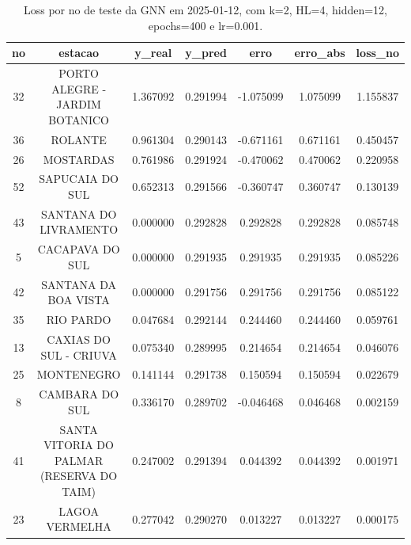 \begin{table}[h]
\centering
\caption{Loss por no de teste da GNN em 2025-01-12, com k=2, HL=4, hidden=12, epochs=400 e lr=0.001.}
\label{tab:gnn_loss_k2_hl4_h12_e400_d20250112}
\begin{tabular}{ccccccc}
\toprule
no & estacao & y\_real & y\_pred & erro & erro\_abs & loss\_no \\
\midrule
32 & PORTO ALEGRE - JARDIM BOTANICO & 1.367092 & 0.291994 & -1.075099 & 1.075099 & 1.155837 \\
36 & ROLANTE & 0.961304 & 0.290143 & -0.671161 & 0.671161 & 0.450457 \\
26 & MOSTARDAS & 0.761986 & 0.291924 & -0.470062 & 0.470062 & 0.220958 \\
52 & SAPUCAIA DO SUL & 0.652313 & 0.291566 & -0.360747 & 0.360747 & 0.130139 \\
43 & SANTANA DO LIVRAMENTO & 0.000000 & 0.292828 & 0.292828 & 0.292828 & 0.085748 \\
5 & CACAPAVA DO SUL & 0.000000 & 0.291935 & 0.291935 & 0.291935 & 0.085226 \\
42 & SANTANA DA BOA VISTA & 0.000000 & 0.291756 & 0.291756 & 0.291756 & 0.085122 \\
35 & RIO PARDO & 0.047684 & 0.292144 & 0.244460 & 0.244460 & 0.059761 \\
13 & CAXIAS DO SUL - CRIUVA & 0.075340 & 0.289995 & 0.214654 & 0.214654 & 0.046076 \\
25 & MONTENEGRO & 0.141144 & 0.291738 & 0.150594 & 0.150594 & 0.022679 \\
8 & CAMBARA DO SUL & 0.336170 & 0.289702 & -0.046468 & 0.046468 & 0.002159 \\
41 & SANTA VITORIA DO PALMAR (RESERVA DO TAIM) & 0.247002 & 0.291394 & 0.044392 & 0.044392 & 0.001971 \\
23 & LAGOA VERMELHA & 0.277042 & 0.290270 & 0.013227 & 0.013227 & 0.000175 \\
\bottomrule
\end{tabular}
\end{table}
